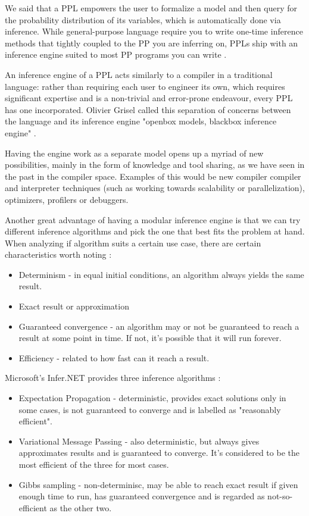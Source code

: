 \begin{itemsize}
We said that a PPL empowers the user to formalize a model and then query for the
probability distribution of its variables, which is automatically done via
inference. While general-purpose language require you to write one-time
inference methods that tightly coupled to the PP you are inferring on, PPLs
ship with an inference engine suited to most PP programs you can write
\cite{Freer2010}.

An inference engine of a PPL acts similarly to a compiler in a traditional
language: rather than requiring each user to engineer its own, which requires
significant expertise and is a non-trivial and error-prone endeavour, every PPL
has one incorporated. Olivier Grisel called this separation of concerns
between the language and its inference engine "openbox models, blackbox
inference engine" \cite{SciPy}.

Having the engine work as a separate model opens up a myriad of new
possibilities, mainly in the form of knowledge and tool sharing, as we have
seen in the past in the compiler space. Examples of this would be new compiler
compiler and interpreter techniques (such as working towards scalability or
parallelization), optimizers, profilers or debuggers.

Another great advantage of having a modular inference engine is that we can
try different inference algorithms and pick the one that best fits the problem
at hand. When analyzing if algorithm suits a certain use case, there are certain
characteristics worth noting \cite{Minka1999}:

\begin{itemize}
  \item Determinism - in equal initial conditions, an algorithm always yields
the same result.
  \item Exact result or approximation
  \item Guaranteed convergence - an algorithm may or not be guaranteed to reach
a result at some point in time. If not, it's possible that it will run forever.
  \item Efficiency - related to how fast can it reach a result.
\end{itemize}

Microsoft's Infer.NET provides three inference algorithms \cite{msalg}:

\begin{itemize}
  \item Expectation Propagation - deterministic, provides exact solutions only
in some cases, is not guaranteed to converge and is labelled as "reasonably
efficient".
  \item Variational Message Passing - also deterministic, but always gives
approximates results and is guaranteed to converge. It's considered to be the
most efficient of the three for most cases.
  \item Gibbs sampling - non-determinisc, may be able to reach exact result
if given enough time to run, has guaranteed convergence and is regarded as
not-so-efficient as the other two.
\end{itemize}


\end{itemsize}
